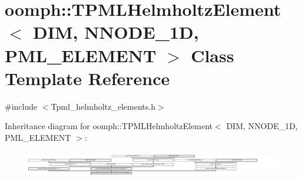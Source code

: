 \hypertarget{classoomph_1_1TPMLHelmholtzElement}{}\section{oomph\+:\+:T\+P\+M\+L\+Helmholtz\+Element$<$ D\+IM, N\+N\+O\+D\+E\+\_\+1D, P\+M\+L\+\_\+\+E\+L\+E\+M\+E\+NT $>$ Class Template Reference}
\label{classoomph_1_1TPMLHelmholtzElement}


{\ttfamily \#include $<$Tpml\+\_\+helmholtz\+\_\+elements.\+h$>$}

Inheritance diagram for oomph\+:\+:T\+P\+M\+L\+Helmholtz\+Element$<$ D\+IM, N\+N\+O\+D\+E\+\_\+1D, P\+M\+L\+\_\+\+E\+L\+E\+M\+E\+NT $>$\+:\begin{figure}[H]
\begin{center}
\leavevmode
\includegraphics[height=1.116427cm]{classoomph_1_1TPMLHelmholtzElement}
\end{center}
\end{figure}
